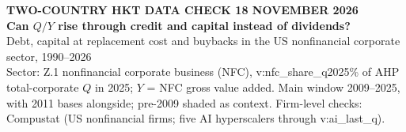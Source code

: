 \documentclass[aspectratio=169,10pt,t]{beamer}
\newcommand{\val}[1]{\csname v:#1\endcsname}
\begin{document}
\begin{frame}[plain]
\vspace{1.3cm}
{\scriptsize\textcolor{muted}{\textbf{TWO-COUNTRY HKT \textperiodcentered{} DATA CHECK \textperiodcentered{} 18 NOVEMBER 2026}}}\\[0.3cm]
{\Large\textbf{Can $Q/Y$ rise through credit and capital instead of dividends?}}\\[0.3cm]
{\normalsize\textcolor{inksec}{Debt, capital at replacement cost and buybacks in the US nonfinancial corporate sector, 1990--2026}}\\[0.7cm]
{\small Sector: Z.1 nonfinancial corporate business (NFC), \val{nfc_share_q2025}\% of AHP total-corporate $Q$ in 2025; $Y$ = NFC gross value added. Main window 2009--2025, with 2011 bases alongside; pre-2009 shaded as context. Firm-level checks: Compustat (US nonfinancial firms; five AI hyperscalers through \val{ai_last_q}).}
\end{frame}
\end{document}
